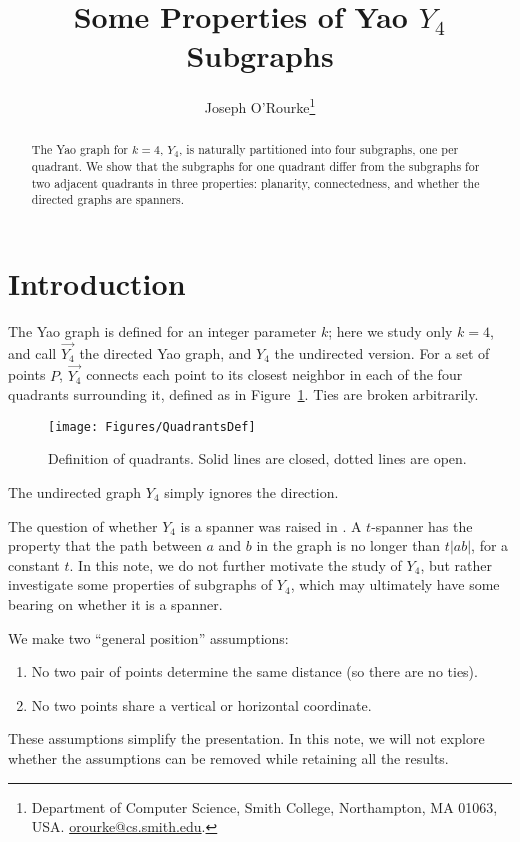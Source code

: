 \pdfoutput=1  \documentclass[]{article}
\title{Some Properties of Yao $Y_4$ Subgraphs}
\author{Joseph O'Rourke\thanks{Department of Computer Science, Smith College, Northampton, MA
      01063, USA.
      \protect\url{orourke@cs.smith.edu}.}
}
\newcommand{\figlab}[1]{\label{fig:#1}}
\newcommand{\figref}[1]{\ref{fig:#1}}
\begin{document}
\maketitle

\begin{abstract}
The Yao graph for $k=4$, $Y_4$, 
is naturally partitioned into four subgraphs, one per quadrant.
We show that the subgraphs for one quadrant differ from the subgraphs for
two adjacent quadrants in three properties:
planarity, connectedness, and whether the directed graphs are spanners.
\end{abstract}


\section{Introduction}
The Yao graph is defined for an integer parameter $k$;
here we study only $k=4$, and call
$\overrightarrow{Y_4}$ the directed Yao graph, and $Y_4$ the undirected version.
For a set of points $P$, $\overrightarrow{Y_4}$ connects each point
to its closest neighbor in each of the four quadrants surrounding it,
defined as in
Figure~\figref{QuadrantsDefinition}.
Ties are broken arbitrarily.
\begin{figure}[htbp]
\centering
\texttt{[image: Figures/QuadrantsDef]}
\caption{Definition of quadrants. Solid lines are closed, dotted lines are open.}
\figlab{QuadrantsDefinition}
\end{figure}
The undirected graph $Y_4$ simply ignores the direction.

The question of whether $Y_4$ is a spanner was raised in
\cite{sppyg-dmp-09}.
A $t$-spanner has the property that the path between $a$ and $b$ in the
graph is no longer than $t |a b|$, for a constant $t$.
In this note, we do not further motivate the study of $Y_4$,
but rather investigate some properties of subgraphs of $Y_4$, which
may ultimately have some bearing on whether it is a spanner.

We make two ``general position'' assumptions:
\begin{enumerate}
\item No two pair of points determine the same distance
(so there are no ties).
\item
No two points share a vertical or horizontal coordinate.
\end{enumerate}
These assumptions simplify the presentation.
In this note, we will not explore whether the assumptions can be removed while retaining
all the results.
\end{document}
